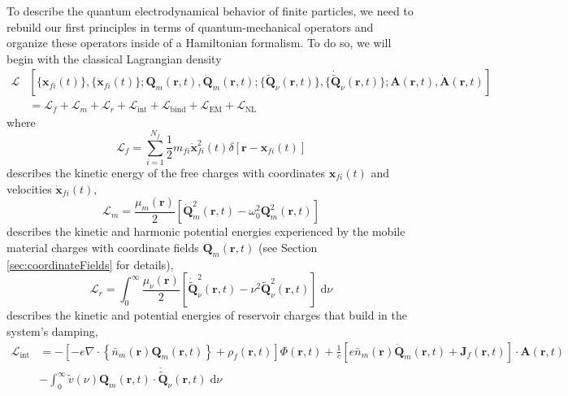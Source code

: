 \documentclass{article}
\begin{document}
To describe the quantum electrodynamical behavior of finite particles, we need to rebuild our first principles in terms of quantum-mechanical operators and organize these operators inside of a Hamiltonian formalism. To do so, we will begin with the classical Lagrangian density 
\begin{equation}\label{eq:lagrangianDensityMQED}
\begin{split}
\mathcal{L}&\left[\{\mathbf{x}_{fi}(t)\},\{\dot{\mathbf{x}}_{fi}(t)\};\mathbf{Q}_m(\mathbf{r},t),\dot{\mathbf{Q}}_m(\mathbf{r},t);\{\tilde{\mathbf{Q}}_\nu(\mathbf{r},t)\},\{\dot{\tilde{\mathbf{Q}}}_\nu(\mathbf{r},t)\};\mathbf{A}(\mathbf{r},t),\dot{\mathbf{A}}(\mathbf{r},t)\right]\\
&= \mathcal{L}_f + \mathcal{L}_m + \mathcal{L}_r + \mathcal{L}_\mathrm{int} + \mathcal{L}_\mathrm{bind} + \mathcal{L}_\mathrm{EM} + \mathcal{L}_\mathrm{NL}
\end{split}
\end{equation}
where
\begin{equation}
\mathcal{L}_f = \sum_{i = 1}^{N_f}\frac{1}{2}m_{fi}\dot{\mathbf{x}}_{fi}^2(t)\delta[\mathbf{r} - \mathbf{x}_{fi}(t)]
\end{equation}
describes the kinetic energy of the free charges with coordinates $\mathbf{x}_{fi}(t)$ and velocities $\dot{\mathbf{x}}_{fi}(t)$,
\begin{equation}
\mathcal{L}_m = \frac{\mu_m(\mathbf{r})}{2}\left[\dot{\mathbf{Q}}_m^2(\mathbf{r},t) - \omega_0^2\mathbf{Q}_m^2(\mathbf{r},t)\right]
\end{equation}
describes the kinetic and harmonic potential energies experienced by the mobile material charges with coordinate fields $\mathbf{Q}_m(\mathbf{r},t)$ (see Section \ref{sec:coordinateFields} for details),
\begin{equation}
\mathcal{L}_r = \int_0^\infty\frac{\mu_\nu(\mathbf{r})}{2}\left[\dot{\tilde{\mathbf{Q}}}_\nu^2(\mathbf{r},t) - \nu^2\tilde{\mathbf{Q}}_\nu^2(\mathbf{r},t)\right]\;\mathrm{d}\nu
\end{equation}
describes the kinetic and potential energies of reservoir charges that build in the system's damping,
\begin{equation}
\begin{split}
\mathcal{L}_\mathrm{int} &= -\left[-e\nabla\cdot\left\{\bar{n}_m(\mathbf{r})\mathbf{Q}_m(\mathbf{r},t)\right\} + \rho_f(\mathbf{r},t)\right]\Phi(\mathbf{r},t) + \frac{1}{c}\left[e\bar{n}_m(\mathbf{r})\dot{\mathbf{Q}}_m(\mathbf{r},t) + \mathbf{J}_f(\mathbf{r},t)\right]\cdot\mathbf{A}(\mathbf{r},t)\\
&- \int_0^\infty \tilde{v}(\nu)\mathbf{Q}_m(\mathbf{r},t)\cdot\dot{\tilde{\mathbf{Q}}}_\nu(\mathbf{r},t)\;\mathrm{d}\nu
\end{split}
\end{equation}
\end{document}
